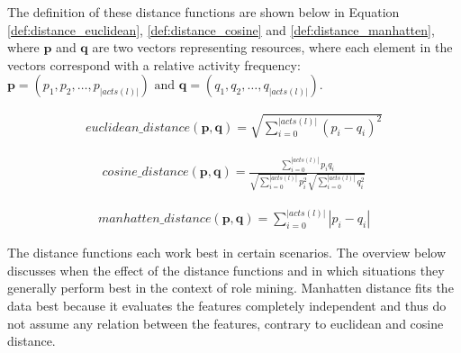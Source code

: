 The definition of these distance functions are shown below in Equation \ref{def:distance_euclidean}, \ref{def:distance_cosine} and \ref{def:distance_manhatten}, where $\mathbf{p}$ and $\mathbf{q}$ are two vectors representing resources, where each element in the vectors correspond with a relative activity frequency: $\mathbf{p}=(p_1,p_2,\dots,p_{|acts(l)|})\text{ and }\mathbf{q}=(q_1,q_2,\dots,q_{|acts(l)|})$.

\begin{equation}\label{def:distance_euclidean}
  \begin{array}{l}
    euclidean\_distance(\mathbf{p},\mathbf{q}) = \sqrt{ \sum_{i=0}^{|acts(l)|}(p_i- q_i)^2}
  \end{array}
\end{equation}


\begin{equation}\label{def:distance_cosine}
  \begin{array}{l}
    cosine\_distance(\mathbf{p},\mathbf{q}) = \frac{ \sum\limits_{i=0}^{|acts(l)|}{p_i  q_i} }{ \sqrt{\sum\limits_{i=0}^{|acts(l)|}{p_i^2}} \sqrt{\sum\limits_{i=0}^{|acts(l)|}{q_i^2}} }
  \end{array}
\end{equation}


\begin{equation}\label{def:distance_manhatten}
  \begin{array}{l}
    manhatten\_distance(\mathbf{p},\mathbf{q}) = \sum_{i=0}^{|acts(l)|} |p_i-q_i|
  \end{array}
\end{equation}

\noindent
The distance functions each work best in certain scenarios. The overview below discusses when the effect of the distance functions and in which situations they generally perform best in the context of role mining. Manhatten distance fits the data best because it evaluates the features completely independent and thus do not assume any relation between the features, contrary to euclidean and cosine distance. 


